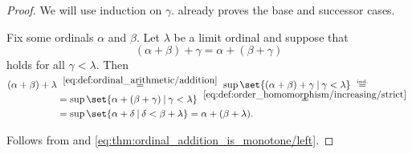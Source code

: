 \begin{proof}
   We will use induction on \( \gamma \).  already proves the base and successor cases.

  Fix some ordinals \( \alpha \) and \( \beta \). Let \( \lambda \) be a limit ordinal and suppose that
  \begin{equation*}
    (\alpha + \beta) + \gamma = \alpha + (\beta + \gamma)
  \end{equation*}
  holds for all \( \gamma < \lambda \). Then
  \begin{align*}
    (\alpha + \beta) + \lambda
    &\reloset {\eqref{eq:def:ordinal_arithmetic/addition}} =
    \sup\set{ (\alpha + \beta) + \gamma \given \gamma < \lambda }
    \reloset {\T{ind.}} = \\ &=
    \sup\set{ \alpha + (\beta + \gamma) \given \gamma < \lambda }
    \reloset {\eqref{eq:def:order_homomorphism/increasing/strict}} = \\ &=
    \sup\set{ \alpha + \delta \given \delta < \beta + \lambda }
    =
    \alpha + (\beta + \lambda).
  \end{align*}

   Follows from  and \eqref{eq:thm:ordinal_addition_is_monotone/left}.
\end{proof}

